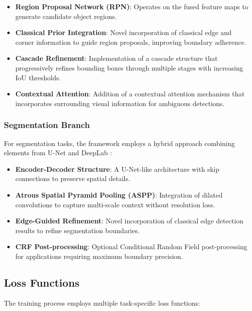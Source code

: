 \begin{itemize}
    \item \textbf{Region Proposal Network (RPN)}: Operates on the fused feature maps to generate candidate object regions.
    
    \item \textbf{Classical Prior Integration}: Novel incorporation of classical edge and corner information to guide region proposals, improving boundary adherence.
    
    \item \textbf{Cascade Refinement}: Implementation of a cascade structure that progressively refines bounding boxes through multiple stages with increasing IoU thresholds.
    
    \item \textbf{Contextual Attention}: Addition of a contextual attention mechanism that incorporates surrounding visual information for ambiguous detections.
\end{itemize}

\subsubsection{Segmentation Branch}
For segmentation tasks, the framework employs a hybrid approach combining elements from U-Net \cite{ronneberger2015u} and DeepLab \cite{chen2017deeplab}:

\begin{itemize}
    \item \textbf{Encoder-Decoder Structure}: A U-Net-like architecture with skip connections to preserve spatial details.
    
    \item \textbf{Atrous Spatial Pyramid Pooling (ASPP)}: Integration of dilated convolutions to capture multi-scale context without resolution loss.
    
    \item \textbf{Edge-Guided Refinement}: Novel incorporation of classical edge detection results to refine segmentation boundaries.
    
    \item \textbf{CRF Post-processing}: Optional Conditional Random Field post-processing for applications requiring maximum boundary precision.
\end{itemize}

\subsection{Loss Functions}
The training process employs multiple task-specific loss functions:

